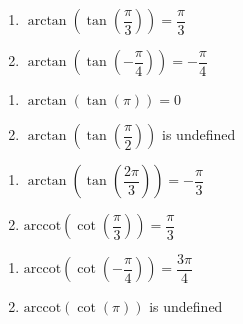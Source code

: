\documentclass{ximera}
\begin{document}
\begin{multicols}{2}

\begin{enumerate}

\setcounter{enumi}{\value{HW}}

\item  $\arctan\left(\tan\left(\dfrac{\pi}{3}\right) \right) = \dfrac{\pi}{3}$
\item  $\arctan\left(\tan\left(-\dfrac{\pi}{4}\right) \right) = -\dfrac{\pi}{4}$

\setcounter{HW}{\value{enumi}}

\end{enumerate}

\end{multicols}

\begin{multicols}{2}

\begin{enumerate}

\setcounter{enumi}{\value{HW}}

\item  $\arctan\left(\tan\left(\pi\right) \right) = 0$ 
\item  $\arctan\left(\tan\left(\dfrac{\pi}{2}\right) \right)$ is undefined

\setcounter{HW}{\value{enumi}}

\end{enumerate}

\end{multicols}

\begin{multicols}{2}

\begin{enumerate}

\setcounter{enumi}{\value{HW}}

\item  $\arctan\left(\tan\left(\dfrac{2\pi}{3}\right) \right) = -\dfrac{\pi}{3}$
\item  $\text{arccot}\left(\cot\left(\dfrac{\pi}{3}\right) \right) = \dfrac{\pi}{3}$ 

\setcounter{HW}{\value{enumi}}

\end{enumerate}

\end{multicols}

\begin{multicols}{2}

\begin{enumerate}

\setcounter{enumi}{\value{HW}}

\item  $\text{arccot}\left(\cot\left(-\dfrac{\pi}{4}\right) \right) = \dfrac{3\pi}{4}$
\item  $\text{arccot}\left(\cot\left(\pi\right) \right)$ is undefined 

\setcounter{HW}{\value{enumi}}

\end{enumerate}

\end{multicols}
\end{document}
